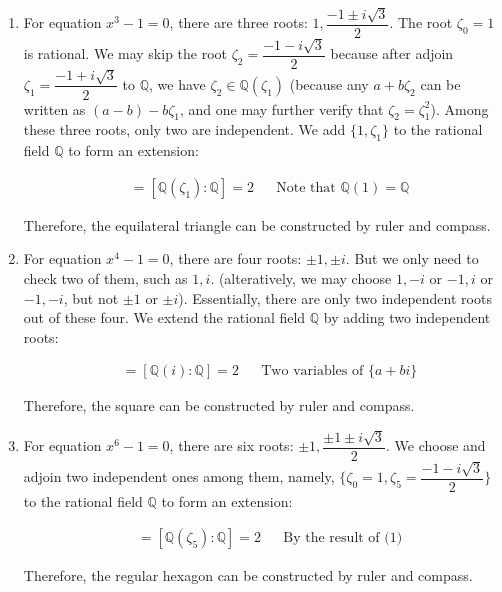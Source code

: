 \begin{enumerate}[(1)]
\item For equation $x^3 - 1 = 0$, there are three roots: $1, \dfrac{-1 \pm i\sqrt{3}}{2}$. The root $\zeta_0 = 1$ is rational. We may skip the root $\zeta_2 = \dfrac{-1 - i\sqrt{3}}{2}$ because after adjoin $\zeta_1 = \dfrac{-1 + i\sqrt{3}}{2}$ to $\mathbb{Q}$, we have $\zeta_2 \in \mathbb{Q}(\zeta_1)$ (because any $a + b \zeta_2$ can be written as $(a - b) - b \zeta_1$, and one may further verify that $\zeta_2 = \zeta_1^2$). Among these three roots, only two are independent. We add $\{1, \zeta_1\}$ to the rational field $\mathbb{Q}$ to form an extension:

\begin{align*}
[\mathbb{Q}(1, \zeta_1) : \mathbb{Q}] &= [\mathbb{Q}(\zeta_1) : \mathbb{Q}] = 2  && \text{Note that }\mathbb{Q}(1) = \mathbb{Q}
\end{align*}

Therefore, the equilateral triangle can be constructed by ruler and compass.

\item For equation $x^4 - 1 = 0$, there are four roots: $\pm 1, \pm i$. But we only need to check two of them, such as $1, i$. (alteratively, we may choose $1, -i$ or $-1, i$ or $-1, -i$, but not $\pm 1$ or $\pm i$). Essentially, there are only two independent roots out of these four. We extend the rational field $\mathbb{Q}$ by adding two independent roots:

\begin{align*}
[\mathbb{Q}(1, i) : \mathbb{Q}] &= [\mathbb{Q}(i) : \mathbb{Q}] = 2 && \text{Two variables of } \{a + bi\}
\end{align*}

Therefore, the square can be constructed by ruler and compass.

\item For equation $x^6 - 1 = 0$, there are six roots: $\pm 1, \dfrac{\pm 1 \pm i\sqrt{3}}{2}$. We choose and adjoin two independent ones among them, namely, $\{\zeta_0 = 1, \zeta_5 = \dfrac{-1 - i\sqrt{3}}{2}\}$ to the rational field $\mathbb{Q}$ to form an extension:

\begin{align*}
[\mathbb{Q}(1, \zeta_5) : \mathbb{Q}] &= [\mathbb{Q}(\zeta_5) : \mathbb{Q}] = 2 && \text{By the result of (1)}
\end{align*}

Therefore, the regular hexagon can be constructed by ruler and compass.
\end{enumerate}


